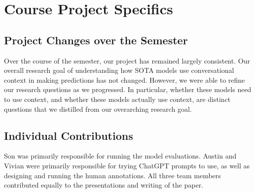 \section{Course Project Specifics}

\subsection{Project Changes over the Semester}

Over the course of the semester, our project has remained largely consistent.
Our overall research goal of understanding how SOTA models use conversational context in making predictions has not changed.
However, we were able to refine our research questions as we progressed.
In particular, whether these models need to use context, and whether these models actually use context, are distinct questions that we distilled from our overarching research goal.

\subsection{Individual Contributions}
Son was primarily responsible for running the model evaluations. 
Austin and Vivian were primarily responsible for trying ChatGPT prompts to use, as well as designing and running the human annotations.
All three team members contributed equally to the presentations and writing of the paper.
